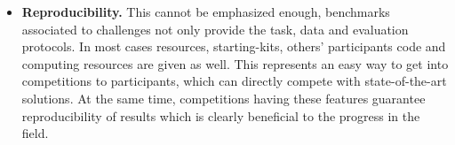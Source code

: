 \documentclass[twoside,11pt]{article}
\begin{document}
\begin{itemize}
    \item \textbf{Reproducibility.} This cannot be emphasized enough,  benchmarks associated to challenges not only provide the task, data and evaluation protocols. In most cases resources, starting-kits, others' participants code and computing resources are given as well. This represents an easy way to get into competitions to participants, which can directly compete with state-of-the-art solutions. At the same time, competitions having these features %
    guarantee reproducibility of results which is clearly beneficial to the progress in the field. %
\end{itemize} 
\end{document}
